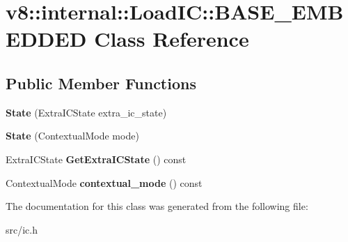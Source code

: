\hypertarget{classv8_1_1internal_1_1_load_i_c_1_1_b_a_s_e___e_m_b_e_d_d_e_d}{}\section{v8\+:\+:internal\+:\+:Load\+I\+C\+:\+:B\+A\+S\+E\+\_\+\+E\+M\+B\+E\+D\+D\+E\+D Class Reference}
\label{classv8_1_1internal_1_1_load_i_c_1_1_b_a_s_e___e_m_b_e_d_d_e_d}
\subsection*{Public Member Functions}
\begin{DoxyCompactItemize}
\item 
\hypertarget{classv8_1_1internal_1_1_load_i_c_1_1_b_a_s_e___e_m_b_e_d_d_e_d_ad191154541daa1c4b76dcaefb069f71d}{}{\bfseries State} (Extra\+I\+C\+State extra\+\_\+ic\+\_\+state)\label{classv8_1_1internal_1_1_load_i_c_1_1_b_a_s_e___e_m_b_e_d_d_e_d_ad191154541daa1c4b76dcaefb069f71d}

\item 
\hypertarget{classv8_1_1internal_1_1_load_i_c_1_1_b_a_s_e___e_m_b_e_d_d_e_d_a279d7db9bb66396cdfe481f65eacd586}{}{\bfseries State} (Contextual\+Mode mode)\label{classv8_1_1internal_1_1_load_i_c_1_1_b_a_s_e___e_m_b_e_d_d_e_d_a279d7db9bb66396cdfe481f65eacd586}

\item 
\hypertarget{classv8_1_1internal_1_1_load_i_c_1_1_b_a_s_e___e_m_b_e_d_d_e_d_a06abb279c52c22df57399d72723f1ee5}{}Extra\+I\+C\+State {\bfseries Get\+Extra\+I\+C\+State} () const \label{classv8_1_1internal_1_1_load_i_c_1_1_b_a_s_e___e_m_b_e_d_d_e_d_a06abb279c52c22df57399d72723f1ee5}

\item 
\hypertarget{classv8_1_1internal_1_1_load_i_c_1_1_b_a_s_e___e_m_b_e_d_d_e_d_a82839f6bf4d52c45ff3d345fa7b6997b}{}Contextual\+Mode {\bfseries contextual\+\_\+mode} () const \label{classv8_1_1internal_1_1_load_i_c_1_1_b_a_s_e___e_m_b_e_d_d_e_d_a82839f6bf4d52c45ff3d345fa7b6997b}

\end{DoxyCompactItemize}


The documentation for this class was generated from the following file\+:\begin{DoxyCompactItemize}
\item 
src/ic.\+h\end{DoxyCompactItemize}
